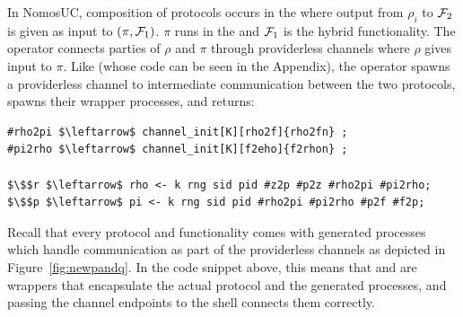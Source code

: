 In NomosUC, composition of protocols occurs in the \partywrapper where output from $\rho_i$ to $\mathcal{F}_2$ is given as input to $(\pi, \mathcal{F}_1)$. $\pi$ runs in the \partywrapper and $\mathcal{F}_1$ is the hybrid functionality. 
The operator connects parties of $\rho$ and $\pi$ through providerless channels where $\rho$ gives input to $\pi$. 
Like  (whose code can be seen in the Appendix), the operator spawns a providerless channel to intermediate communication between the two protocols, spawns their wrapper processes, and returns:

\begin{lstlisting}[basicstyle=\footnotesize\BeraMonottFamily, mathescape, frame=single]
#rho2pi $\leftarrow$ channel_init[K][rho2f]{rho2fn} ;
#pi2rho $\leftarrow$ channel_init[K][f2eho]{f2rhon} ;

$\$$r $\leftarrow$ rho <- k rng sid pid #z2p #p2z #rho2pi #pi2rho; 
$\$$p $\leftarrow$ pi <- k rng sid pid #rho2pi #pi2rho #p2f #f2p;
\end{lstlisting}

Recall that every protocol and functionality comes with generated processes which handle communication as part of the providerless channels as depicted in Figure~\ref{fig:newpandq}.
In the code snippet above, this means that  and  are wrappers that encapsulate the actual protocol and the generated processes, and passing the channel endpoints to the shell connects them correctly. 



